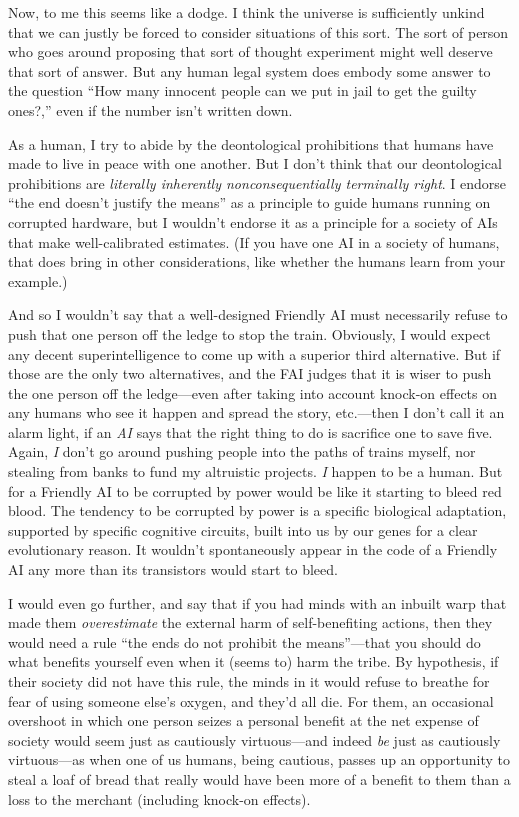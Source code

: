 {
 Now, to me this seems like a dodge. I think the universe is
sufficiently unkind that we can justly be forced to consider situations
of this sort. The sort of person who goes around proposing that sort of
thought experiment might well deserve that sort of answer. But any
human legal system does embody some answer to the question
``How many innocent people can we put in jail to get
the guilty ones?,'' even if the number
isn't written down.}

{
 As a human, I try to abide by the deontological prohibitions that
humans have made to live in peace with one another. But I
don't think that our deontological prohibitions are
\textit{literally inherently nonconsequentially terminally right}. I
endorse ``the end doesn't justify the
means'' as a principle to guide humans running on
corrupted hardware, but I wouldn't endorse it as a
principle for a society of AIs that make well-calibrated estimates. (If
you have one AI in a society of humans, that does bring in other
considerations, like whether the humans learn from your example.)}

{
 And so I wouldn't say that a well-designed
Friendly AI must necessarily refuse to push that one person off the
ledge to stop the train. Obviously, I would expect any decent
superintelligence to come up with a superior third alternative. But if
those are the only two alternatives, and the FAI judges that it is
wiser to push the one person off the ledge---even after taking into
account knock-on effects on any humans who see it happen and spread the
story, etc.---then I don't call it an alarm light, if
an \textit{AI} says that the right thing to do is sacrifice one to save
five. Again, \textit{I} don't go around pushing people
into the paths of trains myself, nor stealing from banks to fund my
altruistic projects. \textit{I} happen to be a human. But for a
Friendly AI to be corrupted by power would be like it starting to bleed
red blood. The tendency to be corrupted by power is a specific
biological adaptation, supported by specific cognitive circuits, built
into us by our genes for a clear evolutionary reason. It
wouldn't spontaneously appear in the code of a Friendly
AI any more than its transistors would start to bleed.}

{
 I would even go further, and say that if you had minds with an
inbuilt warp that made them \textit{overestimate} the external harm of
self-benefiting actions, then they would need a rule
``the ends do not prohibit the
means''---that you should do what benefits yourself
even when it (seems to) harm the tribe. By hypothesis, if their society
did not have this rule, the minds in it would refuse to breathe for
fear of using someone else's oxygen, and
they'd all die. For them, an occasional overshoot in
which one person seizes a personal benefit at the net expense of
society would seem just as cautiously virtuous---and indeed \textit{be}
just as cautiously virtuous---as when one of us humans, being cautious,
passes up an opportunity to steal a loaf of bread that really would
have been more of a benefit to them than a loss to the merchant
(including knock-on effects).}

